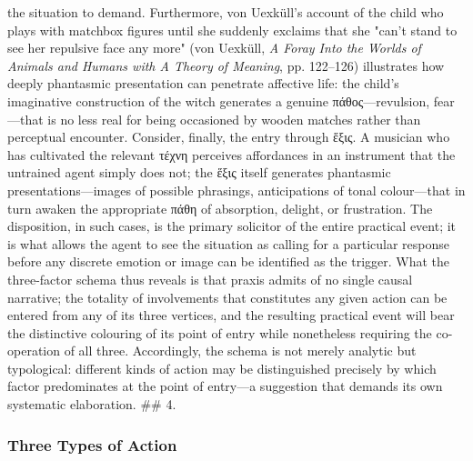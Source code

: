 \documentclass{article}
\begin{document}
the situation to demand. Furthermore, von Uexküll's account of the child who plays with matchbox figures until she suddenly exclaims that she "can't stand to see her repulsive face any more" (von Uexküll, \textit{A Foray Into the Worlds of Animals and Humans with A Theory of Meaning}, pp. 122–126) illustrates how deeply phantasmic presentation can penetrate affective life: the child's imaginative construction of the witch generates a genuine πάθος—revulsion, fear—that is no less real for being occasioned by wooden matches rather than perceptual encounter. Consider, finally, the entry through ἕξις. A musician who has cultivated the relevant τέχνη perceives affordances in an instrument that the untrained agent simply does not; the ἕξις itself generates phantasmic presentations—images of possible phrasings, anticipations of tonal colour—that in turn awaken the appropriate πάθη of absorption, delight, or frustration. The disposition, in such cases, is the primary solicitor of the entire practical event; it is what allows the agent to see the situation as calling for a particular response before any discrete emotion or image can be identified as the trigger. What the three-factor schema thus reveals is that praxis admits of no single causal narrative; the totality of involvements that constitutes any given action can be entered from any of its three vertices, and the resulting practical event will bear the distinctive colouring of its point of entry while nonetheless requiring the co-operation of all three. Accordingly, the schema is not merely analytic but typological: different kinds of action may be distinguished precisely by which factor predominates at the point of entry—a suggestion that demands its own systematic elaboration. ## 4. 

\subsubsection*{Three Types of Action}
\end{document}
